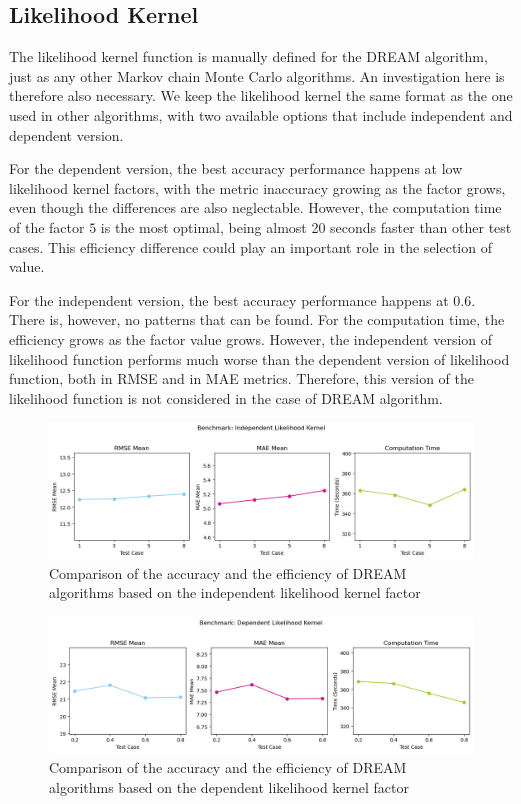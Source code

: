 \subsection{Likelihood Kernel}
The likelihood kernel function is manually defined for the DREAM algorithm, just as any other Markov chain Monte Carlo algorithms. An investigation here is therefore also necessary. We keep the likelihood kernel the same format as the one used in other algorithms, with two available options that include independent and dependent version.

For the dependent version, the best accuracy performance happens at low likelihood kernel factors, with the metric inaccuracy growing as the factor grows, even though the differences are also neglectable. However, the computation time of the factor $5$ is the most optimal, being almost 20 seconds faster than other test cases. This efficiency difference could play an important role in the selection of value.

For the independent version, the best accuracy performance happens at $0.6$. There is, however, no patterns that can be found. For the computation time, the efficiency grows as the factor value grows.
However, the independent version of likelihood function performs much worse than the dependent version of likelihood function, both in RMSE and in MAE metrics. Therefore, this version of the likelihood function is not considered in the case of DREAM algorithm.
\begin{figure}[H]
    \centering
    \includegraphics[width=1\textwidth]{figures/dream/indp_likelihood.png}
    \captionsetup{width=.8\textwidth}
    \caption{Comparison of the accuracy and the efficiency of DREAM algorithms based on the independent likelihood kernel factor}
    \label{fig:enter-label}
\end{figure}

\begin{figure}[H]
    \centering
    \includegraphics[width=1\textwidth]{figures/dream/dp_likelihood.png}
    \captionsetup{width=.8\textwidth}
    \caption{Comparison of the accuracy and the efficiency of DREAM algorithms based on the dependent likelihood kernel factor}
    \label{fig:enter-label}
\end{figure}

